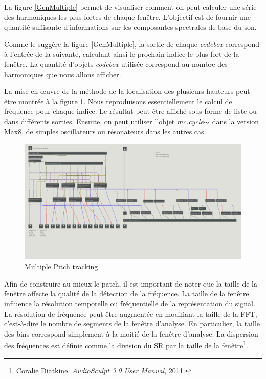 La figure \ref{GenMultiple} permet de visualiser comment on peut calculer une série des harmoniques les plus fortes de chaque fenêtre. L'objectif est de fournir une quantité suffisante d'informations sur les composantes spectrales de base du son.

Comme le suggère la figure \ref{GenMultiple}, la sortie de chaque \textit{codebox} correspond à l'entrée de la suivante, calculant ainsi le prochain indice le plus fort de la fenêtre. La quantité d’objets \textit{codebox} utilisée correspond au nombre des harmoniques que nous allons afficher.

La mise en œuvre de la méthode de la localisation des plusieurs hauteurs peut être montrée à la figure \ref{Analysis}. Nous reproduisons essentiellement le calcul de fréquence pour chaque indice. Le résultat peut être affiché sous forme de liste ou dans différents sorties. Ensuite, on peut utiliser l’objet \textit{mc.cycle$\thicksim $} dans la version Max8, de simples oscillateurs ou résonateurs dans les autres cas.

    \begin{figure}
        \centering
        \includegraphics[width = \textwidth]{Graphs/MultipleTrack.png}
        \caption{Multiple Pitch tracking}
        \label{Analysis}
    \end{figure}

Afin de construire au mieux le patch, il est important de noter que la taille de la fenêtre affecte la qualité de la détection de la fréquence. La taille de la fenêtre influence la résolution temporelle ou fréquentielle de la représentation du signal. La résolution de fréquence peut être augmentée en modifiant la taille de la FFT, c'est-à-dire le nombre de segments de la fenêtre d'analyse. En particulier, la taille des bins correspond simplement à la moitié de la fenêtre d’analyse. La dispersion des fréquences est définie comme la division du SR par la taille de la fenêtre\footnote{Coralie Diatkine, \textit{AudioSculpt 3.0 User Manual}, 2011. \nocite{Audiosculpt}}.

